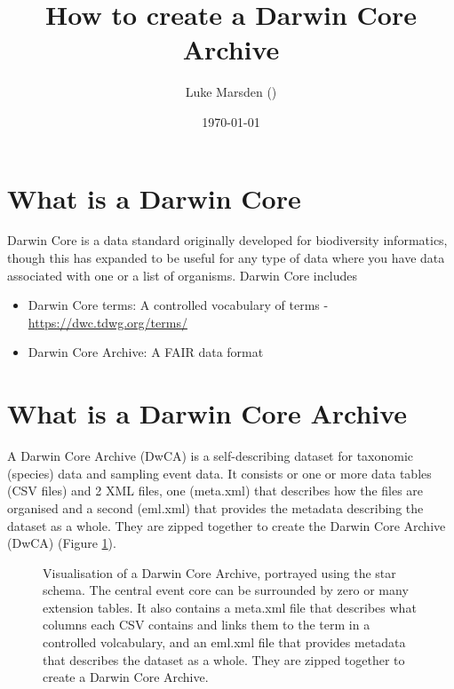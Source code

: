 \documentclass[a4paper,english, 11pt]{article}
\title{How to create a Darwin Core Archive}
\date{\today}
\author{Luke Marsden (\emailme)}
\begin{document}
\maketitle
\tableofcontents
\newpage

\section{What is a Darwin Core}
\label{s:dwc}

Darwin Core is a data standard originally developed for biodiversity informatics, though this has expanded to be useful for any type of data where you have data associated with one or a list of organisms. Darwin Core includes
\begin{itemize}
\item Darwin Core terms: A controlled vocabulary of terms - \url{https://dwc.tdwg.org/terms/}
\item Darwin Core Archive: A FAIR data format
\end{itemize} 

\section{What is a Darwin Core Archive}
\label{s:dwca}

A Darwin Core Archive (DwCA) is a self-describing dataset for taxonomic (species) data and sampling event data. It consists or one or more data tables (CSV files) and 2 XML files, one (meta.xml) that describes how the files are organised and a second  (eml.xml) that provides the metadata describing the dataset as a whole. They are zipped together to create the Darwin Core Archive (DwCA) (Figure \ref{fig:dwca}). 

\begin{figure}[htb]
    \caption{\label{fig:dwca}
        Visualisation of a Darwin Core Archive, portrayed using the star schema. The
        central event core can be surrounded by zero or many extension tables.
        It also contains a meta.xml file that describes what columns each CSV contains and links them to the term in a controlled volcabulary, and an eml.xml file that provides metadata that describes the dataset as a whole. They are zipped together to create a Darwin Core Archive.
    }
\end{figure}
\end{document}

